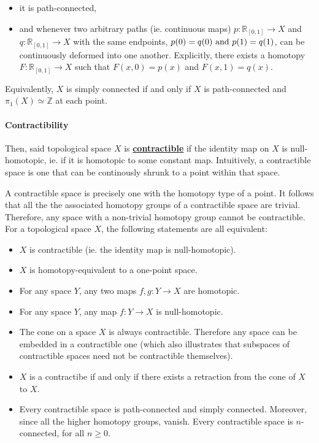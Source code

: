 \documentclass{homework}
\begin{document}
\begin{itemize}
    \item it is path-connected,
    \item and whenever two arbitrary paths (ie. continuous maps) $p: \mathds{R}_{[0,1]} \to X$ and $q: \mathds{R}_{[0,1]} \to X$ with the same endpoints, $p(0) = q(0) \textnormal{ and } p(1) = q(1)$, can be continuously deformed into one another. Explicitly, there exists a homotopy $F: \mathds{R}_{[0,1]} \to X$ such that $F(x,0) = p(x)$ and $F(x,1) = q(x)$. \\
\end{itemize}

Equivalently, $X$ is simply connected if and only if $X$ is path-connected and $\pi_1 (X) \simeq \mathds{Z}$ at each point. \\

\paragraph{\textbf{Contractibility}}

 Then, said topological space $X$ is \underline{\textbf{contractible}} if the identity map on $X$ is null-homotopic, ie. if it is homotopic to some constant map. Intuitively, a contractible space is one that can be continously shrunk to a point within that space.

A contractible space is precisely one with the homotopy type of a point. It follows that all the the associated homotopy groups of a contractible space are trivial. Therefore, any space with a non-trivial homotopy group cannot be contractible. For a topological space $X$, the following statements are all equivalent:

\begin{itemize}
    \item $X$ is contractible (ie. the identity map is null-homotopic). 
    \item $X$ is homotopy-equivalent to a one-point space. 
    \item For any space $Y$, any two maps $f, g: Y \rightarrow X$ are homotopic.
    \item For any space $Y$, any map $f: Y \rightarrow X$ is null-homotopic. 
    \item The cone on a space $X$ is always contractible. Therefore any space can be embedded in a contractible one (which also illustrates that subspaces of contractible spaces need not be contractible themselves).
    \item $X$ is a contractibe if and only if there exists a retraction from the cone of $X$ to $X$.
    \item Every contractible space is path-connected and simply connected. Moreover, since all the higher homotopy groups, vanish. Every contractible space is $n$-connected, for all $n \geq 0$.\\ 
\end{itemize}
\end{document}
